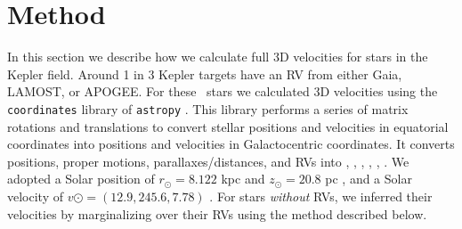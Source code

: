 \section{Method}
\label{sec:method}

In this section we describe how we calculate full 3D velocities for stars in
the Kepler field.
Around 1 in 3 Kepler targets have an RV from either Gaia, LAMOST, or APOGEE.
For these \nrv\ stars we calculated 3D velocities using the {\tt coordinates}
library of {\tt astropy} \citep{astropy2013, astropy2018}.
This library performs a series of matrix rotations and translations to convert
stellar positions and velocities in equatorial
coordinates into positions and velocities in Galactocentric coordinates.
It converts positions, proper motions, parallaxes/distances, and RVs into \x,
\y, \z, \vx, \vy, \vz.
We adopted a Solar position of $r_\odot = 8.122$ kpc \citep{gravity2018} and
$z_\odot = 20.8$ pc \citep{bennet2019}, and a Solar velocity of $v\odot =
(12.9, 245.6, 7.78)$ \kms \citep{drimmel2018}.
For stars {\it without} RVs, we inferred their velocities by marginalizing
over their RVs using the method described below.


